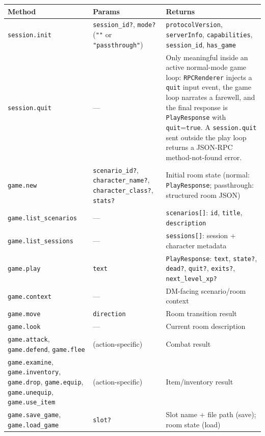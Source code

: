 \documentclass[a4paper,10pt]{article}
\newcommand{\field}[1]{\texttt{#1}}
\begin{document}
\begin{center}
\begin{tabular}{lp{4cm}p{5cm}}
\toprule
\textbf{Method} & \textbf{Params} & \textbf{Returns} \\
\midrule
\texttt{session.init}
  & \field{session\_id?}, \field{mode?}
    (\texttt{""} or \texttt{"passthrough"})
  & \field{protocolVersion}, \field{serverInfo},
    \field{capabilities}, \field{session\_id},
    \field{has\_game} \\
\texttt{session.quit}
  & ---
  & Only meaningful inside an active normal-mode game loop:
    \texttt{RPCRenderer} injects a \texttt{quit} input event,
    the game loop narrates a farewell, and the final response is
    \texttt{PlayResponse} with \field{quit}=\texttt{true}. A
    \texttt{session.quit} sent outside the play loop returns a
    JSON-RPC method-not-found error. \\
\texttt{game.new}
  & \field{scenario\_id?}, \field{character\_name?},
    \field{character\_class?}, \field{stats?}
  & Initial room state (normal: \texttt{PlayResponse};
    passthrough: structured room JSON) \\
\texttt{game.list\_scenarios}
  & ---
  & \field{scenarios[]}: \field{id}, \field{title},
    \field{description} \\
\texttt{game.list\_sessions}
  & ---
  & \field{sessions[]}: session + character metadata \\
\texttt{game.play}
  & \field{text}
  & \texttt{PlayResponse}: \field{text}, \field{state?},
    \field{dead?}, \field{quit?}, \field{exits?},
    \field{next\_level\_xp?} \\
\texttt{game.context}
  & ---
  & DM-facing scenario/room context \\
\texttt{game.move}
  & \field{direction}
  & Room transition result \\
\texttt{game.look}
  & ---
  & Current room description \\
\texttt{game.attack}, \texttt{game.defend}, \texttt{game.flee}
  & (action-specific)
  & Combat result \\
\texttt{game.examine}, \texttt{game.inventory},
  \texttt{game.drop}, \texttt{game.equip}, \texttt{game.unequip},
  \texttt{game.use\_item}
  & (action-specific)
  & Item/inventory result \\
\texttt{game.save\_game}, \texttt{game.load\_game}
  & \field{slot?}
  & Slot name + file path (save); room state (load) \\
\bottomrule
\end{tabular}
\end{center}
\end{document}
